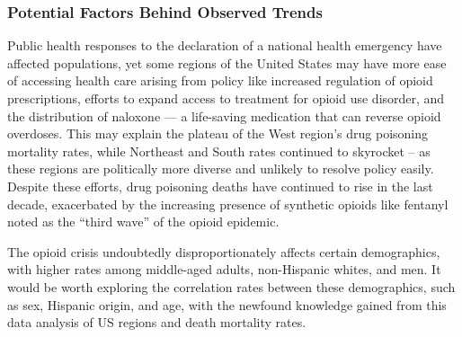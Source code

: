 \documentclass[
]{article}
\begin{document}
\subsubsection{Potential Factors Behind Observed
Trends}\label{potential-factors-behind-observed-trends}

Public health responses to the declaration of a national health
emergency have affected populations, yet some regions of the United
States may have more ease of accessing health care arising from policy
like increased regulation of opioid prescriptions, efforts to expand
access to treatment for opioid use disorder, and the distribution of
naloxone --- a life-saving medication that can reverse opioid overdoses.
This may explain the plateau of the West region's drug poisoning
mortality rates, while Northeast and South rates continued to skyrocket
-- as these regions are politically more diverse and unlikely to resolve
policy easily. Despite these efforts, drug poisoning deaths have
continued to rise in the last decade, exacerbated by the increasing
presence of synthetic opioids like fentanyl noted as the ``third wave''
of the opioid epidemic.

The opioid crisis undoubtedly disproportionately affects certain
demographics, with higher rates among middle-aged adults, non-Hispanic
whites, and men. It would be worth exploring the correlation rates
between these demographics, such as sex, Hispanic origin, and age, with
the newfound knowledge gained from this data analysis of US regions and
death mortality rates.
\end{document}
